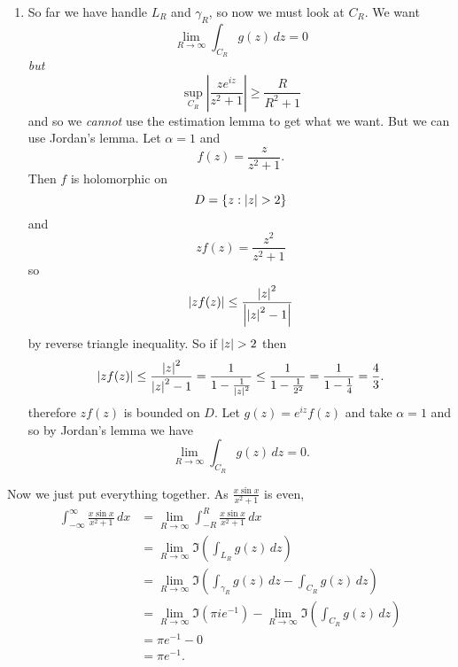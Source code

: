 \begin{solution}
\begin{enumerate}
        \item 
            So far we have handle $L_R$ and $\gamma_R$, so now we must look at $C_R$.
            We want
            \[
                \lim_{R \to \infty} \int_{C_R} g(z) \,dz = 0
            \]
            \emph{but}
            \[
                \sup_{C_R}
                \left\lvert
                    \frac{ze^{iz}}{z^2 + 1} 
                \right\rvert
                \geq \frac{R}{R^2 + 1}
            \]
            and so we \emph{cannot} use the estimation lemma to get what we want.
            But we can use Jordan's lemma.
            Let $\alpha = 1$ and
            \[
                f(z) = \frac{z}{z^2 + 1}.
            \]
            Then $f$ is holomorphic on 
            \[
                D = \{ z: \left\lvert z\right\rvert > 2 \}
            \]
            and
            \[
                zf(z) = \frac{z^2}{z^2 + 1} 
            \]
            so
            \[
                \left\lvert zf(z)\right\rvert \leq \frac{\left\lvert z\right\rvert^2}{\left\lvert\left\lvert z\right\rvert^2 - 1\right\rvert} 
            \]
            by reverse triangle inequality.
            So if $\left\lvert z\right\rvert > 2$ then
            \[
                \left\lvert zf(z)\right\rvert \leq \frac{\left\lvert z\right\rvert^2}{\left\lvert z\right\rvert^2 - 1} 
                = \frac{1}{1 - \frac{1}{\left\lvert z\right\rvert^2}} 
                \leq \frac{1}{1 - \frac{1}{2^2}}
                = \frac{1}{1 - \frac14}
                = \frac43.
            \]
            therefore $zf(z)$ is bounded on $D$.
            Let $g(z) = e^{iz} f(z)$ and take $\alpha = 1$ and so by Jordan's lemma we have
            \[
                \lim_{R \to \infty} \int_{C_R} g(z) \,dz = 0.
            \]
    \end{enumerate}
    Now we just put everything together.
    As $ \frac{x \sin x}{x^2 + 1} $ is even,
    \begin{align*}
        \int_{-\infty}^{\infty} \frac{x \sin x}{x^2 + 1} \,dx
        &= \lim_{R \to \infty} \int_{-R}^{R} \frac{x \sin x}{x^2 + 1} \,dx \\
        &= \lim_{R \to \infty} \Im \left( \int_{L_R} g(z) \,dz \right) \\
        &= \lim_{R \to \infty} \Im \left( \int_{\gamma_R} g(z) \,dz - \int_{C_R} g(z) \,dz \right) \\
        &= \lim_{R \to \infty} \Im(\pi i e^{-1}) - \lim_{R \to \infty} \Im\left(\int_{C_R} g(z) \,dz\right) \\
        &= \pi e^{-1} - 0 \\
        &= \pi e^{-1}.
    \end{align*}
\end{solution}

